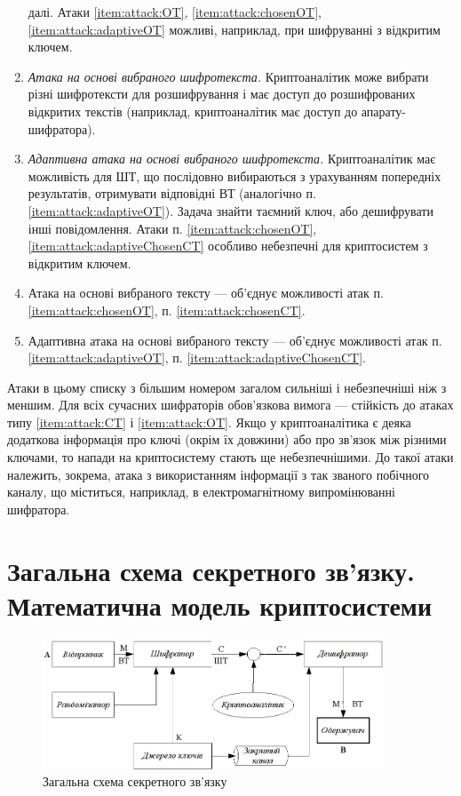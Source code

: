 \begin{enumerate}
    далі. Атаки \ref{item:attack:OT}, \ref{item:attack:chosenOT},
    \ref{item:attack:adaptiveOT} можливі, наприклад, при шифруванні з відкритим
    ключем.  \item\label{item:attack:chosenCT} \textit{Атака на основі
    вибраного шифротекста.} Криптоаналітик може вибрати різні шифротексти для
    розшифрування і має доступ до розшифрованих відкритих текстів (наприклад,
    криптоаналітик має доступ до апарату-шифратора).
\item\label{item:attack:adaptiveChosenCT} \textit{Адаптивна атака на основі
    вибраного шифротекста.} Криптоаналітик має можливість для ШТ, що послідовно
    вибираються з урахуванням попередніх результатів, отримувати відповідні ВТ
    (аналогічно п. \ref{item:attack:adaptiveOT}). Задача знайти таємний ключ,
    або дешифрувати інші повідомлення. Атаки п. \ref{item:attack:chosenOT},
    \ref{item:attack:adaptiveChosenCT} особливо небезпечні для криптосистем з
    відкритим ключем.  \item Атака на основі вибраного тексту  --- об'єднує
    можливості атак п. \ref{item:attack:chosenOT}, п.
    \ref{item:attack:chosenCT}.  \item Адаптивна атака на основі вибраного
    тексту  --- об'єднує можливості атак п. \ref{item:attack:adaptiveOT},
    п. \ref{item:attack:adaptiveChosenCT}.
\end{enumerate}

Атаки в цьому списку з більшим номером загалом сильніші і небезпечніші ніж з
меншим. Для всіх сучасних шифраторів обов'язкова вимога --- стійкість до атаках
типу \ref{item:attack:CT} і \ref{item:attack:OT}.
Якщо у криптоаналітика є деяка додаткова інформація про ключі
(окрім їх довжини) або про зв'язок між різними ключами, то напади на
криптосистему  стають ще небезпечнішими. До такої атаки належить, зокрема, атака
з використанням інформації з так званого побічного каналу, що міститься,
наприклад, в електромагнітному випромінюванні шифратора.

\section{Загальна схема секретного зв'язку. Математична модель криптосистеми}

\begin{figure}[h!]
    \centering\includegraphics[width=4.0in]{crypt-img/crypt-img4.png}
    \caption{Загальна схема секретного зв'язку}\label{img:secretConnection}
\end{figure}

